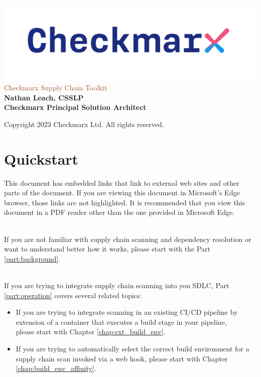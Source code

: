 \documentclass[a4paper, 11pt, oneside]{book}
\begin{document}
\begin{titlepage}
    \thispagestyle{empty}
    \centering
    \includegraphics[scale=.4]{graphics/cx_logo-dark.png}
    \vfill
    \textcolor{Sienna}{\Huge Checkmarx Supply Chain Toolkit\\}
    \vfill
    {\Large\textbf{Nathan Leach, CSSLP\\Checkmarx Principal Solution Architect}}
\end{titlepage}

\newpage

\begin{titlepage}
\begin{center}
\Large Copyright \faCopyright{ }2023 Checkmarx Ltd. All rights reserved.
\end{center}
\end{titlepage}

\newpage

\chapter*{Quickstart}

This document has embedded links that link to external web sites and other
parts of the document.  If you are viewing this document in Microsoft's Edge
browser, those links are not highlighted.  It is recommended that you view
this document in a PDF reader other than the one provided in Microsoft Edge.

\noindent\\If you are not familiar with supply chain scanning and
dependency resolution or want to understand better how it works, please
start with the Part \ref{part:background}.

\noindent\\If you are trying to integrate supply chain scanning into
you SDLC, Part \ref{part:operation} covers several related topics:

\begin{itemize}
    \item If you are trying to integrate scanning in an existing CI/CD pipeline by \\
    extension of a container that executes a build stage in your pipeline, \\
    please start with Chapter \ref{chap:ext_build_env}.
    \item If you are trying to automatically select the correct build environment for a \\
    supply chain scan invoked via a web hook, please start with Chapter \ref{chap:build_env_affinity}.
    
\end{itemize}
\end{document}
